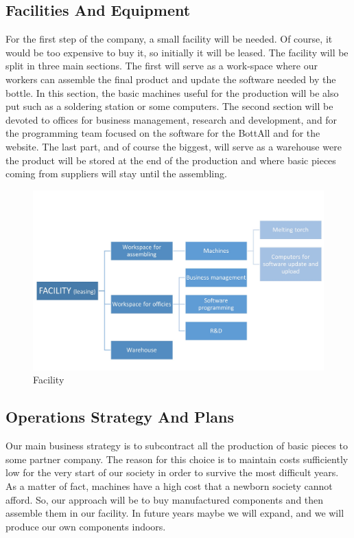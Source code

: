 \subsection{Facilities And Equipment}
For the first step of the company, a small facility will be needed. Of course, it would be too expensive to buy it, so initially it will be leased. 
The facility will be split in three main sections. The first will serve as a work-space where our workers can assemble the final product and update the software needed by the bottle. In this section, the basic machines useful for the production will be also put such as a soldering station or some computers.
The second section will be devoted to offices for business management, research and development, and for the programming team focused on the software for the BottAll and for the website.
The last part, and of course the biggest, will serve as a warehouse were the product will be stored at the end of the production and where basic pieces coming from suppliers will stay until the assembling.
\begin{figure}[H]
\centering
\includegraphics[width=1\textwidth]{images/Facility.jpg}
\caption{Facility}
\end{figure}
\subsection{Operations Strategy And Plans}
Our main business strategy is to subcontract all the production of basic pieces to some partner company. The reason for this choice is to maintain costs sufficiently low for the very start of our society in order to survive the most difficult years. As a matter of fact, machines have a high cost that a newborn society cannot afford. So, our approach will be to buy manufactured components and then assemble them in our facility. In future years maybe we will expand, and we will produce our own components indoors.

